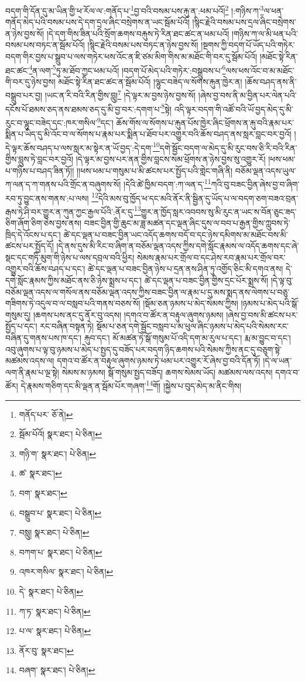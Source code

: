 བདག་གི་དོན་དུ་མ་ཡིན་གྱི་ཕ་རོལ་ལ་:གནོད་པ་\footnote{གནོད་པར་  ཅོ་ནེ། }བྱ་བའི་བསམ་པས་རྐུ་ན་:ཕམ་པའོ།\footnote{སྦོམ་པོའོ།  སྣར་ཐང་།  པེ་ཅིན། } །:གཉིས་ཀ་\footnote{གཉི་ག་  སྣར་ཐང་།  པེ་ཅིན། }ལ་ཕན་གནོད་མེད་པའི་བསམ་པས་དེ་དག་དྲལ་ཞིང་བསྲེགས་ན་ཡང་སྦོམ་པོའོ། །སྙིང་རྗེའི་བསམ་པས་དྲལ་ཞིང་བསྲེགས་ན་ཉེས་བྱས་སོ། །དེ་དག་གིས་ཟིན་པའི་སྲོག་ཆགས་བརྐུས་ཏེ་རིན་ཐང་ཚང་ན་ཕམ་པའོ། །གཉིས་ཀ་ལ་མི་ཕན་པའི་བསམ་པས་བཏང་ན་སྦོམ་པོའོ། །སྙིང་རྗེའི་བསམ་པས་བཏང་ན་ཉེས་བྱས་སོ། །སྔགས་ཀྱི་བདག་པོ་ཡོད་པའི་གཏེར་བདག་གིར་བྱས་པ་སྒྲུབ་པ་ལས་གཏེར་ཕས་འོང་ན་ཇི་ཙམ་མིག་གིས་མ་མཐོང་གི་བར་དུ་སྦོམ་པོའོ། །མཐོང་སྟེ་རིན་ཐང་ཚང་\footnote{ཚ་  སྣར་ཐང་། }ན་ལག་\footnote{བག་  སྣར་ཐང་། }ཏུ་མ་ཐོབ་ཀྱང་ཕམ་པའོ། །བདག་པོ་མེད་པའི་གཏེར་:བསྒྲུབས་པ་\footnote{བསྒྲུབ་པ་  སྣར་ཐང་།  པེ་ཅིན། }ལས་ཕས་འོང་བ་མ་མཐོང་གི་བར་དུ་ཉེས་བྱས། མཐོང་སྟེ་རིན་ཐང་ཚང་ན་སྦོམ་པོའོ། །ལྷུང་བཟེད་ལ་སོགས་རྐུན་ཁྱེར་ན། །ཆོས་བཤད་ནས་ནི་བསྒྲུབ་པར་བྱ། །ཡང་ན་རི་བའི་རིན་གྱིས་བླུ།\footnote{བསླུ།  སྣར་ཐང་།  པེ་ཅིན། } །དེ་ལྟར་མ་བྱས་ཉེས་བྱས་སོ། །ཞེས་བྱ་བས་ནི་མ་བྱིན་པར་ལེན་པའི་དངོས་པོ་ཐམས་ཅད་ནས་ཐམས་ཅད་དུ་མི་བྱ་བར་:དགག་པ་\footnote{བཀག་པ་  སྣར་ཐང་།  པེ་ཅིན། }སྟེ། འདི་ལྟར་བདག་གི་འཚོ་བའི་ཡོ་བྱད་མེད་དུ་མི་རུང་བ་ལྷུང་བཟེད་དང་:ཁར་གསིལ་\footnote{འཁར་གསིལ་  སྣར་ཐང་།  པེ་ཅིན། }དང་། ཆོས་གོས་ལ་སོགས་པ་རྐུན་པོས་ཁྱེར་ཞིང་ཕྲོགས་ན་རྐུ་བའི་རྣམ་པར་སྨིན་པ་ཡིད་དུ་མི་འོང་བ་ལ་སོགས་པ་རྣམ་པར་སྨིན་པ་ཐོབ་པར་འགྱུར་བའི་ཆོས་བཤད་ནས་སླར་བླང་བར་བྱའོ། །དེ་ལྟར་ཆོས་བཤད་པ་ལས་སླར་མ་སྟེར་ན་ཡོ་བྱད་:དེ་དག་\footnote{དེ་  སྣར་ཐང་།  པེ་ཅིན། }དགེ་སྦྱོང་བདག་ལ་མེད་དུ་མི་རུང་བས་ཅི་རི་བའི་རིན་གྱིས་བླུས་ཏེ་བླང་བར་བྱའོ། །དེ་ལྟར་མ་བྱས་པར་ནན་གྱིས་བླངས་སམ་ཕྲོགས་ན་ཉེས་བྱས་སུ་འགྱུར་རོ། །ཕས་ཕམ་པ་གཉིས་པ་བཤད་ཟིན་ཏོ།། །།ཕས་ཕམ་པ་གསུམ་པ་མི་ཚངས་པར་སྤྱོད་པའི་གླེང་གཞི་ནི། བཅོམ་ལྡན་འདས་ཡུལ་ཀ་ལན་ད་ཀ་གནས་པའི་གྲོང་ན་བཞུགས་སོ། །དེའི་ཚེ་ཁྱིམ་བདག་:ཀ་ལན་ད་\footnote{ཀ་ཏ་  སྣར་ཐང་།  པེ་ཅིན། }ཀའི་བུ་བཟང་བྱིན་ཞེས་བྱ་བ་ཞིག་རབ་ཏུ་བྱུང་ནས་གནས་:པ་ལས། \footnote{པ་ལ་  སྣར་ཐང་།  པེ་ཅིན། }དེའི་མས་བུ་ཁྱོད་ཕ་དང་མའི་ནོར་ནི་སྦྱིན་དུ་ཡོད་པ་ལ་བདག་ཅག་བཟའ་བྲན་རྒས་ཏེ་ཤི་བར་གྱུར་ན་ཀུན་ཀྱང་རྒྱལ་པོའི་:ནོར་དུ་\footnote{ནོར་བུ་  སྣར་ཐང་། }གྱུར་ན་ཁྱོད་སླར་འབབས་སུ་མི་རུང་ན་ཡང་ས་བོན་ཅུང་ཟད་ཅིག་ཞོག་ཅིག་ཅེས་བྱས་ནས། བཟང་བྱིན་གྱི་ཆུང་མ་ཟླ་མཚན་དང་ལྡན་ཞིང་དུས་ལ་བབ་པ་རྒྱན་གྱིས་ཀླུབས་ཏེ་ཁྲིད་དེ་འོངས་པ་དང་། ཚེ་དང་ལྡན་པ་བཟང་བྱིན་ཡང་འདོད་ཆགས་བདོ་བ་དང་ཉེས་དམིགས་མ་མཐོང་བས་མི་ཚངས་པར་སྤྱོད་དོ། །དེ་ནས་དུས་མི་རིང་བ་ཞིག་ན་བཅོམ་ལྡན་འདས་ཀྱིས་དགེ་སློང་རྣམས་ལ་འདོད་ཆགས་དང་ཞེ་སྡང་དང་གཏི་མུག་གི་ཉེས་པ་ལས་དབྲལ་བའི་ཕྱིར། སེམས་རྣམ་པར་གྲོལ་བ་དང་ཤེས་རབ་རྣམ་པར་གྲོལ་བར་འགྱུར་བའི་ཆོས་བཤད་པ་དང་། ཚེ་དང་ལྡན་པ་བཟང་བྱིན་ཉེས་པ་དྲན་ནས་ཤིན་ཏུ་འགྱོད་ཅིང་མི་དགའ་ནས། དེ་དགེ་སློང་རྣམས་ཀྱིས་མཐོང་ནས་ཅི་ཉེས་སྨྲས་པ་དང་། ཚེ་དང་ལྡན་པ་བཟང་བྱིན་གྱིས་དྲང་པོར་སྨྲས་སོ། །དེ་ལྟ་བུ་བཅོམ་ལྡན་འདས་ལ་གསོལ་ནས་བཅོམ་ལྡན་འདས་ཀྱིས་བཟང་བྱིན་ལ་རྣམ་པ་དུ་མས་སྨད་ནས་ལེགས་པ་བཅུ་གཟིགས་ཏེ་འདུལ་བ་ལ་བསླབ་པའི་གནས་བཅས་སོ། །སྡོམ་ཅན་ཉམས་པ་མེད་སེམས་ཀྱིས། །ཉམས་པ་མེད་པའི་སྒོ་གསུམ་དུ། །ཆགས་པས་ནང་དུ་ནོར་བུ་འདས། །དགའ་བ་ཚོར་ན་བརྟུལ་ཞུགས་ཉམས། །ཞེས་བྱ་བས་མི་ཚངས་པར་སྤྱོད་པ་དང་། རང་བཞིན་བསྟན་ཏེ། སྡོམ་པ་ཅན་དགེ་སྦྱོང་བསླབ་པ་མ་ཕུལ་ཞིང་ཉམས་པ་མེད་པའི་སེམས་རང་བཞིན་དུ་གནས་པས་ཁ་དང་། རྐུབ་དང་། མོ་མཚན་ཏེ་སྒོ་གསུམ་པོ་འདི་དག་མ་རུལ་པ་དང་། རྨ་མ་བྱུང་བ་དང་། འབུ་ཞུགས་པ་ལྟ་བུ་ཉམས་པ་མེད་པ་སྤྱད་དུ་བཟོད་པར་བདག་ཉིད་ཆགས་པའི་སེམས་ཀྱིས་ནང་དུ་བཅུག་སྟེ་མཚམས་འདས་ལ། དགའ་བ་ཚོར་ན་བརྟུལ་ཞུགས་ཉམས་ཏེ་ཕམ་པར་འགྱུར་རོ་ཞེས་བྱ་བའི་དོན་ཏོ། །དེ་ལ་ཡན་ལག་ནི་རྣམ་པ་ལྔ་སྟེ། སེམས་མ་ཉམས། སྒོ་གསུམ་སྤྱད་བཟོད། ཆགས་སེམས་ཡོད། མཚམས་ལས་འདས། དགའ་བ་ཚོར། དེ་རྣམས་གཅིག་དང་མི་ལྡན་ན་སྦོམ་པོར་གཞག་\footnote{བཞག་  སྣར་ཐང་།  པེ་ཅིན། }གོ། །སྐྱེས་པ་བུད་མེད་མ་ནིང་གིས། 